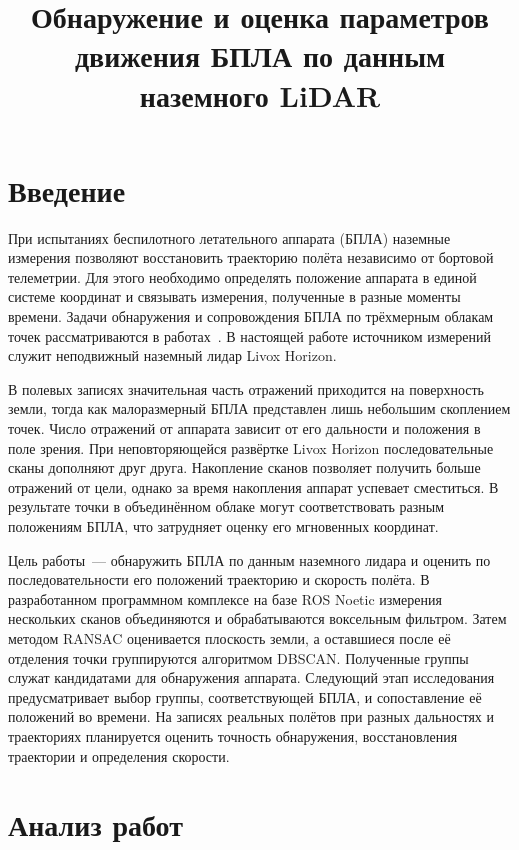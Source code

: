 \documentclass{misisarticle}
\title{Обнаружение и оценка параметров движения БПЛА по данным наземного LiDAR}
\begin{document}
\maketitle

\section{Введение}

При испытаниях беспилотного летательного аппарата (БПЛА) наземные измерения позволяют восстановить траекторию полёта независимо от бортовой телеметрии. Для этого необходимо определять положение аппарата в единой системе координат и связывать измерения, полученные в разные моменты времени. Задачи обнаружения и сопровождения БПЛА по трёхмерным облакам точек рассматриваются в работах~\cite{ref2,ref6}. В настоящей работе источником измерений служит неподвижный наземный лидар Livox Horizon.

В полевых записях значительная часть отражений приходится на поверхность земли, тогда как малоразмерный БПЛА представлен лишь небольшим скоплением точек. Число отражений от аппарата зависит от его дальности и положения в поле зрения. При неповторяющейся развёртке Livox Horizon последовательные сканы дополняют друг друга. Накопление сканов позволяет получить больше отражений от цели, однако за время накопления аппарат успевает сместиться. В результате точки в объединённом облаке могут соответствовать разным положениям БПЛА, что затрудняет оценку его мгновенных координат.

Цель работы~--- обнаружить БПЛА по данным наземного лидара и оценить по последовательности его положений траекторию и скорость полёта. В разработанном программном комплексе на базе ROS Noetic измерения нескольких сканов объединяются и обрабатываются воксельным фильтром. Затем методом RANSAC оценивается плоскость земли, а оставшиеся после её отделения точки группируются алгоритмом DBSCAN. Полученные группы служат кандидатами для обнаружения аппарата. Следующий этап исследования предусматривает выбор группы, соответствующей БПЛА, и сопоставление её положений во времени. На записях реальных полётов при разных дальностях и траекториях планируется оценить точность обнаружения, восстановления траектории и определения скорости.

\section{Анализ работ}
\end{document}
